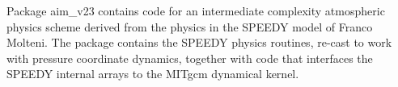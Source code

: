 Package aim\_v23 contains code for an intermediate complexity atmospheric 
physics scheme derived from the physics in the SPEEDY model of Franco Molteni. 
The package contains the SPEEDY physics routines, re-cast to work with pressure
coordinate dynamics, together with code that interfaces the SPEEDY
internal arrays to the MITgcm dynamical kernel.
